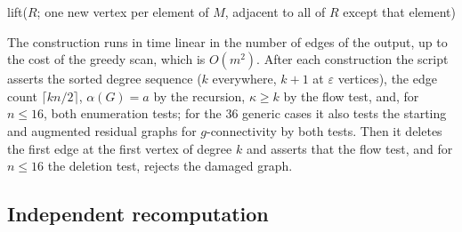 \begin{algorithm}[t]
\caption{The shell graph for $(k,a)$ (EXP-002, function \texttt{construct})}\label{alg:shell}
\Return lift($R$; one new vertex per element of $M$, adjacent to all of $R$ except that element)\;
\end{algorithm}

The construction runs in time linear in the number of edges of the output, up to the cost of the greedy scan, which is $O(m^2)$.
After each construction the script asserts the sorted degree sequence ($k$ everywhere, $k+1$ at $\varepsilon$ vertices), the edge count $\lceil kn/2\rceil$, $\alpha(G)=a$ by the recursion, $\kappa\ge k$ by the flow test, and, for $n\le16$, both enumeration tests; for the 36 generic cases it also tests the starting and augmented residual graphs for $g$-connectivity by both tests.
Then it deletes the first edge at the first vertex of degree $k$ and asserts that the flow test, and for $n\le16$ the deletion test, rejects the damaged graph.

\subsection{Independent recomputation}\label{sec:comp-audit}

